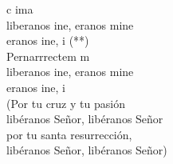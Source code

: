 \begin{cancion}%
	 c  ima\\
	liberanos ine, eranos mine\\
	eranos ine, i (**)\\
	Pernarrrectem m\\
	liberanos ine, eranos mine\\
	eranos ine, i\\
(Por tu cruz y tu pasión\\
 libéranos Señor, libéranos Señor\\
 por tu santa resurrección,\\
 libéranos Señor, libéranos Señor)\\
\end{cancion}%
